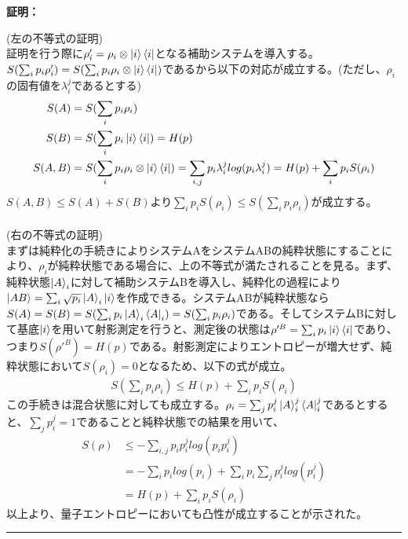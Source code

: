 \documentclass[a4paper,10.5pt]{article}
\numberwithin{equation}{section}
\newenvironment{proofbox}
{\begin{prooflabel}\textbf{証明：}\end{prooflabel}\vspace{0.8em}}
{\par\vspace{1em}\hrule\vspace{1em}}
\begin{document}
\begin{proofbox}
(左の不等式の証明)\\
証明を行う際に$\rho_{i}'=\rho_{i}\otimes \ket{i}\bra{i}$となる補助システムを導入する。$S(\sum_{i}p_{i}\rho_{i}')=S(\sum_{i} p_{i} \rho_{i}\otimes \ket{i}\bra{i})$であるから以下の対応が成立する。(ただし、$\rho_{i}$の固有値を$\lambda^{j}_{i}$であるとする)
\begin{equation}\begin{split}
    S(A)&=S(\sum_{i}p_{i} \rho_{i})\\
    S(B)&=S(\sum_{i}p_{i}\ket{i}\bra{i})=H(p)\\
    S(A,B)&=S(\sum_{i} p_{i} \rho_{i}\otimes \ket{i}\bra{i})
    =\sum_{i,j}p_{i}\lambda_{i}^{j}log(p_{i}\lambda_{i}^{j})
    =H(p)+\sum_{i}p_{i}S(\rho_{i})
\end{split} \end{equation}
$S(A,B)\leq S(A)+S(B)$より$\sum_{i}p_{i}S(\rho_{i})\leq S(\sum_{i}p_{i}\rho_{i})$が成立する。\\
\\
(右の不等式の証明)\\
まずは純粋化の手続きによりシステムAをシステムABの純粋状態にすることにより、$\rho_{i}$が純粋状態である場合に、上の不等式が満たされることを見る。まず、純粋状態$\ket{A}_{i}$に対して補助システムBを導入し、純粋化の過程により$\ket{AB}=\sum_{i}\sqrt{p_{i}}\ket{A}_{i}\ket{i}$を作成できる。システムABが純粋状態なら$S(A)=S(B)=S(\sum_{i}p_{i}\ket{A}_{i}\bra{A}_{i})=S(\sum_{i} p_{i} \rho_{i})$である。そしてシステムBに対して基底$\ket{i}$を用いて射影測定を行うと、測定後の状態は$\rho'^{B}=\sum_{i}p_{i}\ket{i}\bra{i}$であり、つまり$S(\rho'^{B})=H(p)$である。射影測定によりエントロピーが増大せず、純粋状態において$S(\rho_{i})=0$となるため、以下の式が成立。
\begin{equation}\begin{split}
    S(\sum_{i} p_{i}\rho_{i})\leq H(p)+\sum_{i}p_{i}S(\rho_{i})
\end{split} \end{equation}
この手続きは混合状態に対しても成立する。$\rho_{i}=\sum_{j}p^{j}_{i}\ket{A}_{i}^{j}\bra{A}_{i}^{j}$であるとすると、$\sum_{j}p_{i}^{j}=1$であることと純粋状態での結果を用いて、
\begin{equation}\begin{split}
    S(\rho) &\leq -\sum_{i,j}p_{i}p_{i}^{j} log( p_{i}p_{i}^{j})\\
    &=-\sum_{i} p_{i}log(p_{i})+\sum_{i}p_{i}\sum_{j}p_{i}^{j}log(p_{i}^{j})\\
    &=H(p)+\sum_{i}p_{i}S(\rho_{i})
\end{split} \end{equation}
以上より、量子エントロピーにおいても凸性が成立することが示された。
\end{proofbox}
\end{document}

